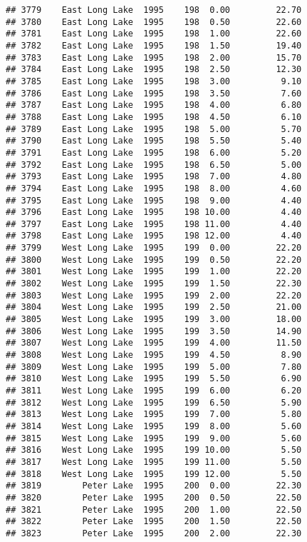 \documentclass[
]{article}
\begin{document}
\begin{verbatim}
## 3779    East Long Lake  1995    198  0.00         22.70
## 3780    East Long Lake  1995    198  0.50         22.60
## 3781    East Long Lake  1995    198  1.00         22.60
## 3782    East Long Lake  1995    198  1.50         19.40
## 3783    East Long Lake  1995    198  2.00         15.70
## 3784    East Long Lake  1995    198  2.50         12.30
## 3785    East Long Lake  1995    198  3.00          9.10
## 3786    East Long Lake  1995    198  3.50          7.60
## 3787    East Long Lake  1995    198  4.00          6.80
## 3788    East Long Lake  1995    198  4.50          6.10
## 3789    East Long Lake  1995    198  5.00          5.70
## 3790    East Long Lake  1995    198  5.50          5.40
## 3791    East Long Lake  1995    198  6.00          5.20
## 3792    East Long Lake  1995    198  6.50          5.00
## 3793    East Long Lake  1995    198  7.00          4.80
## 3794    East Long Lake  1995    198  8.00          4.60
## 3795    East Long Lake  1995    198  9.00          4.40
## 3796    East Long Lake  1995    198 10.00          4.40
## 3797    East Long Lake  1995    198 11.00          4.40
## 3798    East Long Lake  1995    198 12.00          4.40
## 3799    West Long Lake  1995    199  0.00         22.20
## 3800    West Long Lake  1995    199  0.50         22.20
## 3801    West Long Lake  1995    199  1.00         22.20
## 3802    West Long Lake  1995    199  1.50         22.30
## 3803    West Long Lake  1995    199  2.00         22.20
## 3804    West Long Lake  1995    199  2.50         21.00
## 3805    West Long Lake  1995    199  3.00         18.00
## 3806    West Long Lake  1995    199  3.50         14.90
## 3807    West Long Lake  1995    199  4.00         11.50
## 3808    West Long Lake  1995    199  4.50          8.90
## 3809    West Long Lake  1995    199  5.00          7.80
## 3810    West Long Lake  1995    199  5.50          6.90
## 3811    West Long Lake  1995    199  6.00          6.20
## 3812    West Long Lake  1995    199  6.50          5.90
## 3813    West Long Lake  1995    199  7.00          5.80
## 3814    West Long Lake  1995    199  8.00          5.60
## 3815    West Long Lake  1995    199  9.00          5.60
## 3816    West Long Lake  1995    199 10.00          5.50
## 3817    West Long Lake  1995    199 11.00          5.50
## 3818    West Long Lake  1995    199 12.00          5.50
## 3819        Peter Lake  1995    200  0.00         22.30
## 3820        Peter Lake  1995    200  0.50         22.50
## 3821        Peter Lake  1995    200  1.00         22.50
## 3822        Peter Lake  1995    200  1.50         22.50
## 3823        Peter Lake  1995    200  2.00         22.30

\end{verbatim}
\end{document}

